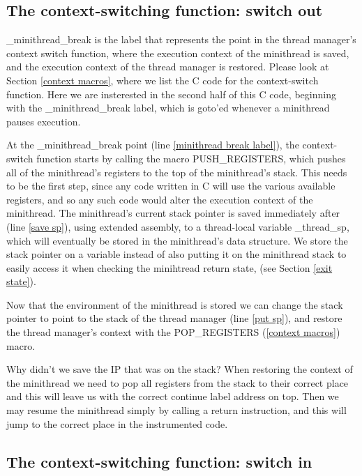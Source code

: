 \documentclass[12pt,a4paper]{report}
\begin{document}
\subsection{The context-switching function: switch out}\label{switch out function}

\_minithread\_break is the label that represents the point in the thread manager's context switch function, where the execution context of the minithread is saved, and the execution context of the thread manager is restored. Please look at Section \ref{context macros}, where we list the C code for the context-switch function. Here we are insterested in the second half of this C code, beginning with the \_minithread\_break label, which is goto'ed whenever a minithread pauses execution.

At the \_minithread\_break point (line \ref{minithread break label}), the context-switch function starts by calling the macro PUSH\_REGISTERS, which pushes all of the minithread's registers to the top of the minithread's stack. This needs to be the first step, since any code written in C will use the various available registers, and so any such code would alter the execution context of the minithread. The minithread's current stack pointer is saved immediately after (line \ref{save sp}), using extended assembly, to a thread-local variable \_thread\_sp, which will eventually be stored in the minithread's data structure. We store the stack pointer on a variable instead of also putting it on the minithread stack to easily access it when checking the minihtread return state,     (see Section \ref{exit state}).

Now that the environment of the minithread is stored we can change the stack pointer to point to the stack of the thread manager (line \ref{put sp}), and restore the thread manager's context with the POP\_REGISTERS (\ref{context macros}) macro.

Why didn't we save the IP that was on the stack? When restoring the context of the minithread we need to pop all registers from the stack to their correct place and this will leave us with the correct continue label address on top. Then we may resume the minithread simply by calling a return instruction, and this will jump to the correct place in the instrumented code.

\subsection{The context-switching function: switch in}
\end{document}
